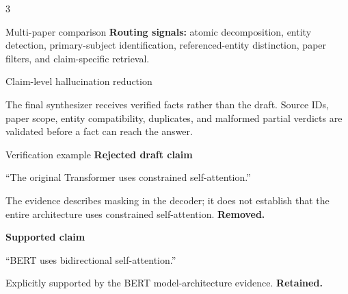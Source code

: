 \documentclass[a0,portrait]{a0poster}
\begin{document}
\begin{multicols}{3}
\begin{posterbox}[colframe=PosterCyan]{Multi-paper comparison}
\textbf{Routing signals:} atomic decomposition, entity detection,
primary-subject identification, referenced-entity distinction, paper filters,
and claim-specific retrieval.
\end{posterbox}

\begin{posterbox}[colframe=PosterCyan]{Claim-level hallucination reduction}
\begin{center}
\end{center}

The final synthesizer receives verified facts rather than the draft. Source IDs,
paper scope, entity compatibility, duplicates, and malformed partial verdicts
are validated before a fact can reach the answer.
\end{posterbox}

\begin{posterbox}{Verification example}
\textbf{Rejected draft claim}\par
\begin{tcolorbox}[colback=PosterRed!6,colframe=PosterRed,arc=3mm]
``The original Transformer uses constrained self-attention.''
\end{tcolorbox}
The evidence describes masking in the decoder; it does not establish that the
entire architecture uses constrained self-attention. \textbf{Removed.}

\vspace{3mm}
\textbf{Supported claim}\par
\begin{tcolorbox}[colback=PosterCyan!7,colframe=PosterCyan,arc=3mm]
``BERT uses bidirectional self-attention.''
\end{tcolorbox}
Explicitly supported by the BERT model-architecture evidence. \textbf{Retained.}
\end{posterbox}


\end{multicols}
\end{document}
